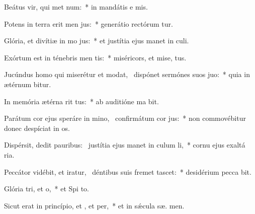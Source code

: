 \item Beátus vir, qui met num:~* in mandátis e  mis.
\item Potens in terra erit men jus:~* generátio rectórum tur.
\item Glória, et divítiæ in mo jus:~* et justítia ejus manet in  culi.
\item Exórtum est in ténebris men tis:~* miséricors, et mise,  tus.
\item Jucúndus homo qui miserétur et modat,~\pscross{} dispónet sermónes suos  juo:~* quia in ætérnum  bitur.
\item In memória ætérna rit tus:~* ab auditióne ma  bit.
\item Parátum cor ejus speráre in mino,~\pscross{} confirmátum  cor jus:~* non commovébitur donec despíciat in os.
\item Dispérsit, dedit pauribus:~\pscross{} justítia ejus manet in culum li,~* cornu ejus exaltá  ria.
\item Peccátor vidébit, et iratur,~\pscross{} déntibus suis fremet  tascet:~* desidérium pecca bit.
\item Glória tri, et o,~* et Spi to.
\item Sicut erat in princípio, et , et per,~* et in sǽcula sæ. men.
